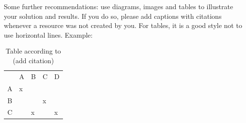\documentclass[
thesis%
]{csthes}
\begin{document}


Some further recommendations: use diagrams, images and tables to illustrate your solution and results. If you do so, please add captions with citations whenever a resource was not created by you. For tables, it is a good style not to use horizontal lines. Example:

\begin{table}[hb!]
\centering
\caption{Table according to (add citation)} 
\begin{tabular}{|c|l|l|l|l|}
\hline
\rowcolor[HTML]{C0C0C0} 
\multicolumn{1}{|l|}{\cellcolor[HTML]{C0C0C0}{\color[HTML]{000000} Some Table}} & {\color[HTML]{000000} A} & {\color[HTML]{000000} B} & {\color[HTML]{000000} C} & {\color[HTML]{000000} D} \\ 
A                                                                               & x                        &                          &                          &                          \\ 
B                                                                               &                          &                          & x                        &                          \\ 
C                                                                               &                          & x                        &                          & x                        \\ 
\end{tabular}

\end{table}
\end{document}
